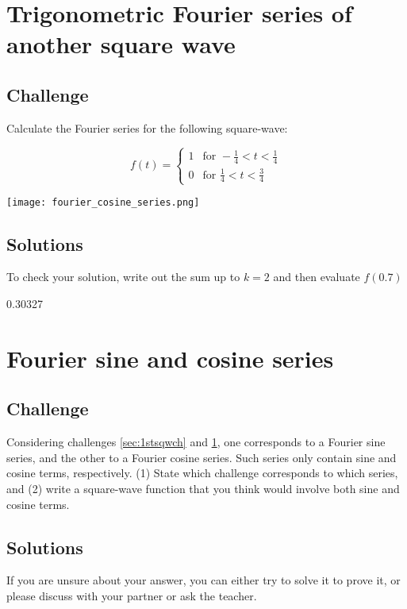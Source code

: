 \section{Trigonometric Fourier series of another square wave}
\label{sec:2ndsqwch}

\subsection*{Challenge}
Calculate the Fourier series for the following square-wave:

\begin{equation}
   f(t) =
   \begin{cases}
       1 & \text{for } -\frac{1}{4} < t < \frac{1}{4} \\
       0 & \text{for } \frac{1}{4} < t <\frac{3}{4} 
   \end{cases} 
\end{equation}

\texttt{[image: fourier\_cosine\_series.png]}

\subsection*{Solutions}
To check your solution, write out the sum up to $k=2$ and then evaluate $f(0.7)$

0.30327



\iffalse
\newpage
\section{Fourier sine and cosine series}

\subsection*{Challenge}
Considering challenges \ref{sec:1stsqwch} and \ref{sec:2ndsqwch}, one corresponds to a Fourier sine series, and the other to a Fourier cosine series. Such series only contain sine and cosine terms, respectively. (1) State which challenge corresponds to which series, and (2) write a square-wave function that you think would involve both sine and cosine terms.

\subsection*{Solutions}
If you are unsure about your answer, you can either try to solve it to prove it, or please discuss with your partner or ask the teacher.




